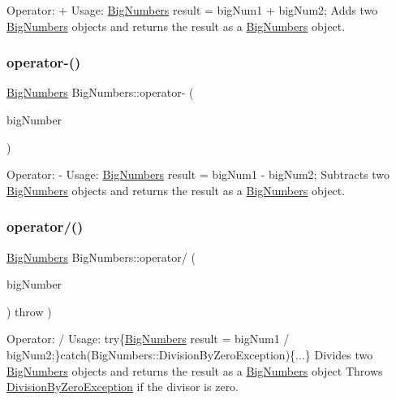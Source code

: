 Operator\+: + Usage\+: \mbox{\hyperlink{class_big_numbers}{Big\+Numbers}} result = big\+Num1 + big\+Num2; Adds two \mbox{\hyperlink{class_big_numbers}{Big\+Numbers}} objects and returns the result as a \mbox{\hyperlink{class_big_numbers}{Big\+Numbers}} object. \mbox{\label{class_big_numbers_ad4b60c48e9da0bd5f9845d7ce73bdc90}} 
\subsubsection{\texorpdfstring{operator-\/()}{operator-()}}
{\footnotesize\ttfamily \mbox{\hyperlink{class_big_numbers}{Big\+Numbers}} Big\+Numbers\+::operator-\/ (\begin{DoxyParamCaption}\item[{const \mbox{\hyperlink{class_big_numbers}{Big\+Numbers}} \&}]{big\+Number }\end{DoxyParamCaption})}

Operator\+: -\/ Usage\+: \mbox{\hyperlink{class_big_numbers}{Big\+Numbers}} result = big\+Num1 -\/ big\+Num2; Subtracts two \mbox{\hyperlink{class_big_numbers}{Big\+Numbers}} objects and returns the result as a \mbox{\hyperlink{class_big_numbers}{Big\+Numbers}} object. \mbox{\label{class_big_numbers_af7ad124c6e92a0ae647f3aa3cd85f11a}} 
\subsubsection{\texorpdfstring{operator/()}{operator/()}}
{\footnotesize\ttfamily \mbox{\hyperlink{class_big_numbers}{Big\+Numbers}} Big\+Numbers\+::operator/ (\begin{DoxyParamCaption}\item[{const \mbox{\hyperlink{class_big_numbers}{Big\+Numbers}} \&}]{big\+Number }\end{DoxyParamCaption}) throw  ) }

Operator\+: / Usage\+: try\{\mbox{\hyperlink{class_big_numbers}{Big\+Numbers}} result = big\+Num1 / big\+Num2;\}catch(\+Big\+Numbers\+::\+Division\+By\+Zero\+Exception)\{...\} Divides two \mbox{\hyperlink{class_big_numbers}{Big\+Numbers}} objects and returns the result as a \mbox{\hyperlink{class_big_numbers}{Big\+Numbers}} object Throws \mbox{\hyperlink{class_big_numbers_1_1_division_by_zero_exception}{Division\+By\+Zero\+Exception}} if the divisor is zero.

